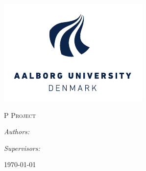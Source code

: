 
\begin{titlepage}
  \centering

  \includegraphics[width=\textwidth]{fig/img/aau-logo.pdf}
  
  \textsc{\LARGE P\projectsemester{} Project}\\
  \textsc{\Large \projectdegree}

  \vspace{2cm}

  {\Huge\bfseries\projecttitle}
  
  \vspace{0.5cm}

  {\Large\bfseries\sffamily\projectsubtitle}
    
  \vspace{2cm}

  \begin{minipage}[t]{0.4\textwidth}
    \begin{flushleft}
      \large
      \emph{Authors:}\\
      \projectauthors
    \end{flushleft}
  \end{minipage}
  \begin{minipage}[t]{0.4\textwidth}
    \begin{flushright}
      \large
      \emph{Supervisors:}\\
      \projectsupervisors
    \end{flushright}
  \end{minipage}

  \vfill

  {\large\today}
\end{titlepage}